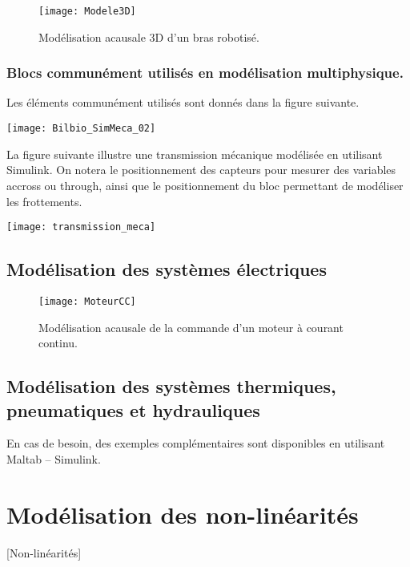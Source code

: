 \begin{figure}[!h]
\texttt{[image: Modele3D]}

\caption{Modélisation acausale 3D d'un bras robotisé.}
\end{figure}

\subsubsection{Blocs communément utilisés en modélisation multiphysique.}
Les éléments communément utilisés sont donnés dans la figure suivante. 

\begin{figure*}[!h]
\texttt{[image: Bilbio\_SimMeca\_02]}
\end{figure*}

La figure suivante illustre une transmission mécanique modélisée en utilisant Simulink. On notera le positionnement des capteurs pour mesurer des variables accross ou through, ainsi que le positionnement du bloc permettant de modéliser les frottements.

\begin{center}
\texttt{[image: transmission\_meca]}
\end{center}

\subsection{Modélisation des systèmes électriques}

\begin{figure}[!h]
\texttt{[image: MoteurCC]}

\caption{Modélisation acausale de la commande d'un moteur à courant continu.}
\end{figure}


\subsection{Modélisation des systèmes thermiques, pneumatiques et hydrauliques}
En cas de besoin, des exemples complémentaires sont disponibles en utilisant Maltab -- Simulink.


\section{Modélisation des non-linéarités}[Non-linéarités]

